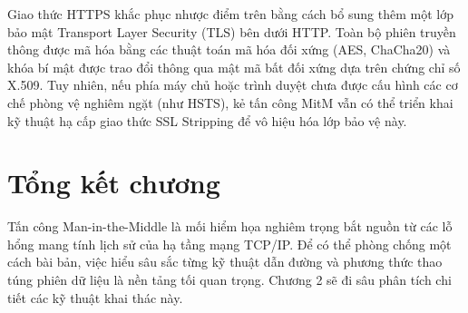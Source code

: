 Giao thức HTTPS \cite{rfc8446_tls13} khắc phục nhược điểm trên bằng cách bổ sung thêm một lớp bảo mật Transport Layer Security (TLS) bên dưới HTTP. Toàn bộ phiên truyền thông được mã hóa bằng các thuật toán mã hóa đối xứng (AES, ChaCha20) và khóa bí mật được trao đổi thông qua mật mã bất đối xứng dựa trên chứng chỉ số X.509. Tuy nhiên, nếu phía máy chủ hoặc trình duyệt chưa được cấu hình các cơ chế phòng vệ nghiêm ngặt (như HSTS), kẻ tấn công MitM vẫn có thể triển khai kỹ thuật hạ cấp giao thức SSL Stripping để vô hiệu hóa lớp bảo vệ này.

\section{Tổng kết chương}

Tấn công Man-in-the-Middle là mối hiểm họa nghiêm trọng bắt nguồn từ các lỗ hổng mang tính lịch sử của hạ tầng mạng TCP/IP. Để có thể phòng chống một cách bài bản, việc hiểu sâu sắc từng kỹ thuật dẫn đường và phương thức thao túng phiên dữ liệu là nền tảng tối quan trọng. Chương 2 sẽ đi sâu phân tích chi tiết các kỹ thuật khai thác này.

